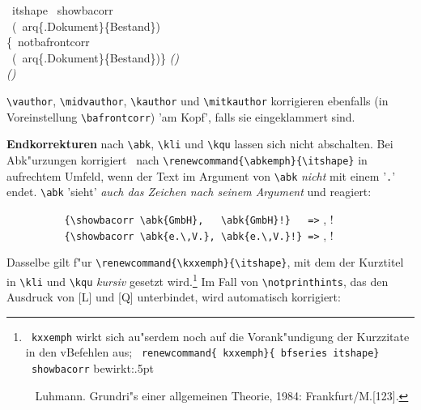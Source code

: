 \documentclass[12pt,a4paper]{article}
\newcommand{\pdfko}[1]{\kern #1pt
                          \strut\ignorespaces}%
\newcommand{\pbs}{\string\ \unskip}
\newcommand{\bs}{\protect\pbs}
\begin{document}
\vspace{-.75ex}
\Doppelbox
{
\bs itshape \bs showbacorr
          \\ \ (\bs arq\{.Dokument\}\{Bestand\})
\\[.25ex] \{\bs notbafrontcorr 
          \\ \ (\bs arq\{.Dokument\}\{Bestand\})\}
}
{\vspace{2.55ex}
\itshape \showbacorr
   ()
\\[2.4ex] {\notbafrontcorr ()}
}

\vspace{-.5ex}\noindent
\verb|\vauthor|, \verb|\midvauthor|, \verb|\kauthor| und 
\verb|\mitkauthor| korrigieren ebenfalls (in Voreinstellung \verb|\bafrontcorr|) 
'am Kopf', falls sie eingeklammert sind. 

\vspace{1.25ex}\noindent
\textbf{Endkorrekturen} nach
\verb|\abk|, \verb|\kli| und \verb|\kqu| lassen sich nicht abschalten. Bei Abk"urzungen 
korrigiert \BibArts\ nach \verb|\renewcommand{\abkemph}{\itshape}| 
in aufrechtem Umfeld, wenn der Text im Argument von \verb|\abk| 
\textit{nicht} mit einem '\texttt{.}' endet. \verb|\abk| 'sieht' 
\textit{auch das Zeichen nach seinem Argument} und reagiert:

\vspace{.6ex}\noindent
{\small\verb|          {\showbacorr \abk{GmbH},   \abk{GmbH}!}   =>|} 
{\renewcommand{\abkemph}{\itshape}\showbacorr {}, !}
\\
{\small\verb|          {\showbacorr \abk{e.\,V.}, \abk{e.\,V.}!} =>|} 
{\renewcommand{\abkemph}{\itshape}\showbacorr {}, !}

\vspace{1.125ex}\noindent
Dasselbe gilt f"ur \verb|\renewcommand{\kxxemph}{\itshape}|, \label{kxxA}
mit dem der Kurztitel in \verb|\kli| und \verb|\kqu| \textit{kursiv} 
gesetzt wird.\footnote{\texttt{\bs kxxemph} wirkt sich au"serdem noch auf die 
Vorank"undigung der Kurzzitate in den v\fhy Befehlen aus;
\renewcommand{\kxxemph}{\bfseries\itshape}\showbacorr
\texttt{\bs renewcommand\{\bs kxxemph\}\{\bs bfseries\bs itshape\}} \texttt{\bs showbacorr}
bewirkt:\pdfko{.5}\  {Luhmann}{. Grundri"s 
einer allgemeinen Theorie, 1984: Frankfurt/M.}[123].} Im Fall von 
\verb|\notprinthints|, das den Ausdruck von {\small [L]} und {\small [Q]} 
unterbindet, wird automatisch korrigiert:
\end{document}
